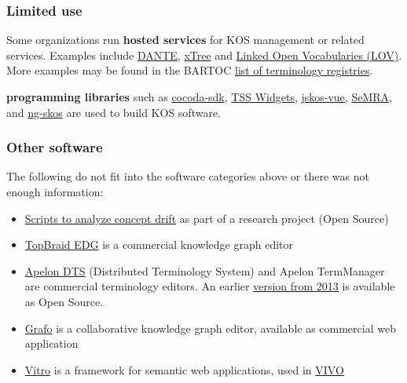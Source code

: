\documentclass[
  DIV=10]{article}
\providecommand{\tightlist}{%
  \setlength{\itemsep}{0pt}\setlength{\parskip}{0pt}}
\begin{document}
\subsubsection{Limited use}\label{limited-use}

Some organizations run \textbf{hosted services} for KOS management or
related services. Examples include
\href{https://doi.org/10.11588/akmb.2018.1.63475}{DANTE},
\href{https://xtree-public.digicult-verbund.de/}{xTree} and
\href{http://lov.okfn.org/dataset/lov/}{Linked Open Vocabularies (LOV)}.
More examples may be found in the BARTOC
\href{https://bartoc.org/registries}{list of terminology registries}.

\textbf{programming libraries} such as
\href{https://github.com/gbv/cocoda-sdk/}{cocoda-sdk},
\href{https://github.com/ts4nfdi/terminology-service-suite}{TSS
Widgets}, \href{https://github.com/gbv/jskos-vue/}{jskos-vue},
\href{https://semra.readthedocs.io/}{SeMRA}, and
\href{http://gbv.github.io/ng-skos/}{ng-skos} are used to build KOS
software.

\subsubsection{Other software}\label{other-software}

The following do not fit into the software categories above or there was
not enough information:

\begin{itemize}
\tightlist
\item
  \href{https://github.com/Multilingual-LGBTQIA-Vocabularies/Examing_LGBTQ_Concepts}{Scripts
  to analyze concept drift} as part of a research project (Open Source)
\item
  \href{https://www.topquadrant.com/topbraid-edg/}{TopBraid EDG} is a
  commercial knowledge graph editor
\item
  \href{https://www.apelondts.org/}{Apelon DTS} (Distributed Terminology
  System) and Apelon TermManager are commercial terminology editors. An
  earlier \href{https://apelon-dts.sourceforge.net/}{version from 2013}
  is available as Open Source.
\item
  \href{https://gra.fo/}{Grafo} is a collaborative knowledge graph
  editor, available as commercial web application
\item
  \href{https://github.com/vivo-project/Vitro}{Vitro} is a framework for
  semantic web applications, used in \href{https://vivoweb.org/}{VIVO}
\end{itemize}
\end{document}
